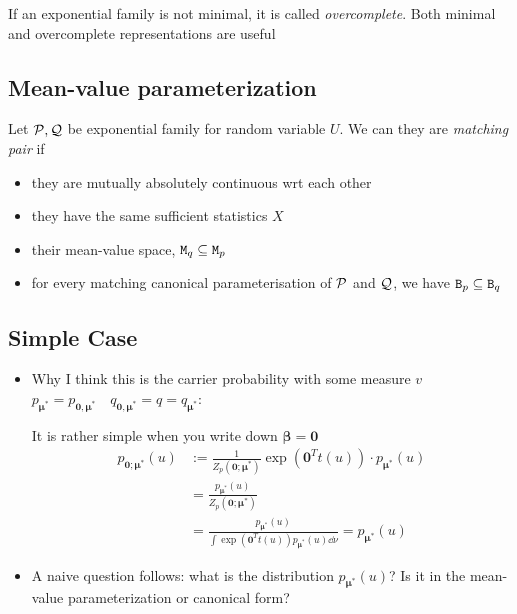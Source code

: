 If an exponential family is not minimal, it is
called \emph{overcomplete}. Both minimal and overcomplete representations are useful



\subsection{Mean-value parameterization}

\begin{define}
	Let $\mathcal{P}, \mathcal{Q}$ be exponential family for random variable $U$.
	We can they are \emph{matching pair} if
	\begin{itemize}
		\item they are mutually absolutely continuous wrt each other
		\item they have the same sufficient statistics $X$
		\item their mean-value space, $\mathtt{M}_q\subseteq\mathtt{M}_p$
		\item for every matching canonical parameterisation of $\mathcal{P}$ and $\mathcal{Q}$,
		      we have $\mathtt{B}_p\subseteq\mathtt{B}_q$
	\end{itemize}
\end{define}



\subsection{Simple Case}
\begin{itemize}
	\item Why I think this is the carrier probability with some measure $v$ $p_{\bm{\mu}^*} = p_{\bm{0}, \bm{\mu}^*} \quad q_{\bm{0},\bm{\mu}^*} = q = q_{\bm{\mu}^*}$:

	      It is rather simple when you write down $\bm{\beta}=\bm{0}$
	      \begin{align*}
		      p_{\bm{0};\bm{\mu}^*}(u) & :=
		      \frac{1}{Z_p(\bm{0};\bm{\mu}^*)}\exp(\bm{0}^T t(u))\cdot p_{\bm{\mu}^*}(u)                               \\
		                               & = \frac{p_{\bm{\mu}^*}(u)}{Z_p(\bm{0};\bm{\mu}^*)}                            \\
		                               & = \frac{p_{\bm{\mu}^*}(u)}{\int\exp(\bm{0}^T t(u)) p_{\bm{\mu}^*}(u)\dd{\nu}}
		      = p_{\bm{\mu}^*}(u)
	      \end{align*}

	\item A naive question follows: what is the distribution $p_{\bm{\mu}^*}(u)$?
	      Is it in the mean-value parameterization or canonical form?
\end{itemize}

